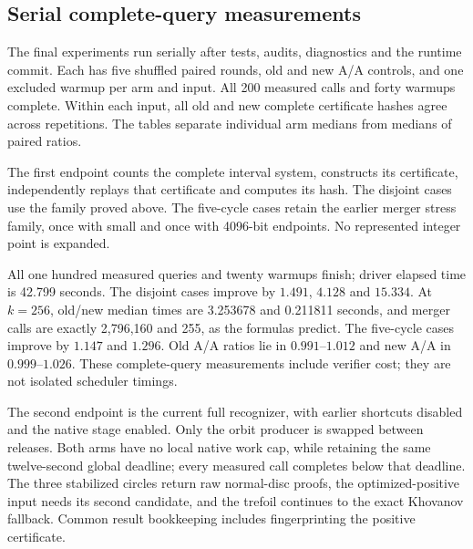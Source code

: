 \subsection{Serial complete-query measurements}

The final experiments run serially after tests, audits, diagnostics and the
runtime commit. Each has five shuffled paired rounds, old and new A/A
controls, and one excluded warmup per arm and input. All 200 measured calls
and forty warmups complete. Within each input, all old and new complete
certificate hashes agree across repetitions. The tables separate individual
arm medians from medians of paired ratios.

The first endpoint counts the complete interval system, constructs its
certificate, independently replays that certificate and computes its hash.
The disjoint cases use the family proved above. The five-cycle cases retain
the earlier merger stress family, once with small and once with 4096-bit
endpoints. No represented integer point is expanded.

\begin{center}
\small

\end{center}

All one hundred measured queries and twenty warmups finish; driver elapsed
time is 42.799 seconds. The disjoint cases improve by $1.491$, $4.128$ and
$15.334$. At $k=256$, old/new median times are 3.253678 and 0.211811 seconds,
and merger calls are exactly 2,796,160 and 255, as the formulas predict.
The five-cycle cases improve by $1.147$ and $1.296$. Old A/A ratios lie in
$0.991$--$1.012$ and new A/A in $0.999$--$1.026$. These complete-query
measurements include verifier cost; they are not isolated scheduler timings.

The second endpoint is the current full recognizer, with earlier shortcuts
disabled and the native stage enabled. Only the orbit producer is swapped
between releases. Both arms have no local native work cap, while retaining
the same twelve-second global deadline; every measured call completes below
that deadline. The three stabilized circles return raw normal-disc proofs,
the optimized-positive input needs its second candidate, and the trefoil
continues to the exact Khovanov fallback. Common result bookkeeping includes
fingerprinting the positive certificate.

\begin{center}
\small

\end{center}

